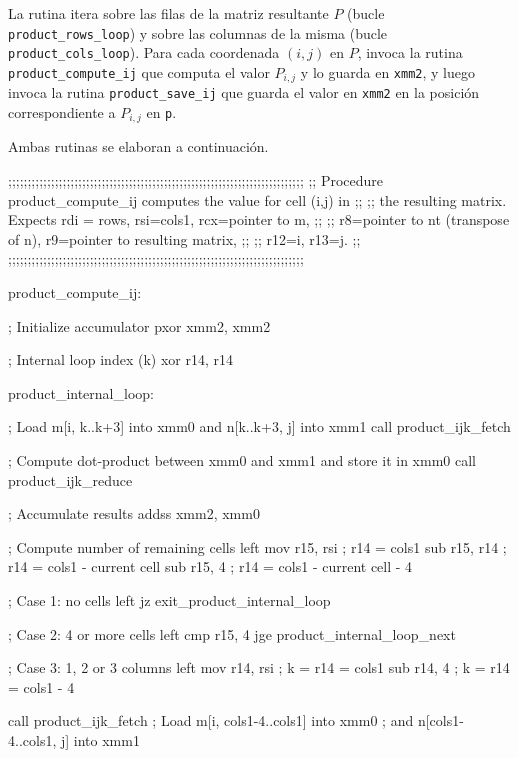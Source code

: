 \documentclass[a4paper, 10pt, twoside]{article}
\newcommand{\cc}[1]{\texttt{#1}}
\begin{document}
La rutina itera sobre las filas de la matriz resultante $P$ (bucle
\cc{product\_rows\_loop}) y sobre las columnas de la misma (bucle
\cc{product\_cols\_loop}). Para cada coordenada $(i,j)$ en $P$, invoca la
rutina \cc{product\_compute\_ij} que computa el valor $P_{i,j}$ y lo guarda en
\cc{xmm2}, y luego invoca la rutina \cc{product\_save\_ij} que guarda el valor
en \cc{xmm2} en la posición correspondiente a $P_{i,j}$ en \cc{p}.

Ambas rutinas se elaboran a continuación.

\begin{code}
  ;;;;;;;;;;;;;;;;;;;;;;;;;;;;;;;;;;;;;;;;;;;;;;;;;;;;;;;;;;;;;;;;;;;;;;;;;;;;
  ;; Procedure product_compute_ij computes the value for cell (i,j) in      ;;
  ;; the resulting matrix. Expects rdi = rows, rsi=cols1, rcx=pointer to m, ;;
  ;; r8=pointer to nt (transpose of n), r9=pointer to resulting matrix,     ;;
  ;; r12=i, r13=j.                                                          ;;
  ;;;;;;;;;;;;;;;;;;;;;;;;;;;;;;;;;;;;;;;;;;;;;;;;;;;;;;;;;;;;;;;;;;;;;;;;;;;;

  product_compute_ij:

    ; Initialize accumulator
    pxor xmm2, xmm2

    ; Internal loop index (k)
    xor r14, r14

  product_internal_loop:

    ; Load m[i, k..k+3] into xmm0 and n[k..k+3, j] into xmm1
    call product_ijk_fetch

    ; Compute dot-product between xmm0 and xmm1 and store it in xmm0
    call product_ijk_reduce

    ; Accumulate results
    addss xmm2, xmm0

    ; Compute number of remaining cells left
    mov r15, rsi             ; r14 = cols1
    sub r15, r14             ; r14 = cols1 - current cell
    sub r15, 4               ; r14 = cols1 - current cell - 4

    ; Case 1: no cells left
    jz exit_product_internal_loop

    ; Case 2: 4 or more cells left
    cmp r15, 4
    jge product_internal_loop_next

    ; Case 3: 1, 2 or 3 columns left
    mov r14, rsi             ; k = r14 = cols1
    sub r14, 4               ; k = r14 = cols1 - 4

    call product_ijk_fetch ; Load m[i, cols1-4..cols1] into xmm0
                           ; and  n[cols1-4..cols1, j] into xmm1


\end{code}
\end{document}
